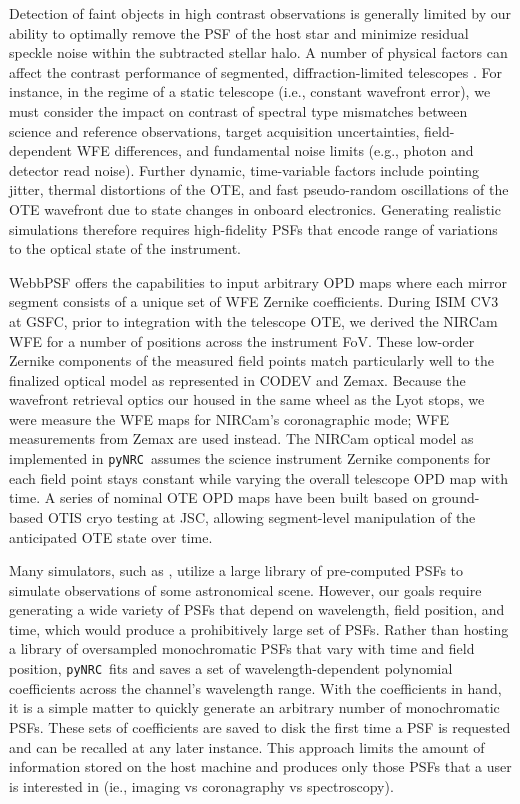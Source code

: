 \documentclass[modern, linenumbers]{aastex62}
\newcommand{\pynrc}{\texttt{\MakeLowercase{py}NRC}}
\begin{document}
Detection of faint objects in high contrast observations is generally limited by our ability to optimally remove the PSF of the host star and minimize residual speckle noise within the subtracted stellar halo. 
A number of physical factors can affect the contrast performance of segmented, diffraction-limited telescopes \citep{perr18}. For instance, in the regime of a static telescope (i.e., constant wavefront error), we must consider the impact on contrast of spectral type mismatches between science and reference observations, target acquisition uncertainties, field-dependent WFE differences, and fundamental noise limits (e.g., photon and detector read noise). Further dynamic, time-variable factors include pointing jitter, thermal distortions of the OTE, and fast pseudo-random oscillations of the OTE wavefront due to state changes in onboard electronics.
Generating realistic simulations therefore requires high-fidelity PSFs that encode range of variations to the optical state of the instrument.

WebbPSF offers the capabilities to input arbitrary OPD maps where each mirror segment consists of a unique set of WFE Zernike coefficients.
During ISIM CV3 at GSFC, prior to integration with the telescope OTE, we derived the NIRCam WFE for a number of positions across the instrument FoV. 
These low-order Zernike components of the measured field points match particularly well to the finalized optical model as represented in CODEV and Zemax.
Because the wavefront retrieval optics our housed in the same wheel as the Lyot stops, we were measure the WFE maps for NIRCam's coronagraphic mode; WFE measurements from Zemax are used instead.
The NIRCam optical model as implemented in \pynrc\ assumes the science instrument Zernike components for each field point stays constant while varying the overall telescope OPD map with time.
A series of nominal OTE OPD maps have been built based on ground-based OTIS cryo testing at JSC, allowing segment-level manipulation of the anticipated OTE state over time. 

Many simulators, such as , utilize a large library of pre-computed PSFs to simulate observations of some astronomical scene.
However, our goals require generating a wide variety of PSFs that depend on wavelength, field position, and time, which would produce a prohibitively large set of PSFs.  
Rather than hosting a library of oversampled monochromatic PSFs that vary with time and field position, \pynrc\ fits and saves a set of wavelength-dependent polynomial coefficients across the channel's wavelength range. 
With the coefficients in hand, it is a simple matter to quickly generate an arbitrary number of monochromatic PSFs. 
These sets of coefficients are saved to disk the first time a PSF is requested and can be recalled at any later instance. This approach limits the amount of information stored on the host machine and produces only those PSFs that a user is interested in (ie., imaging vs coronagraphy vs spectroscopy).
\end{document}

